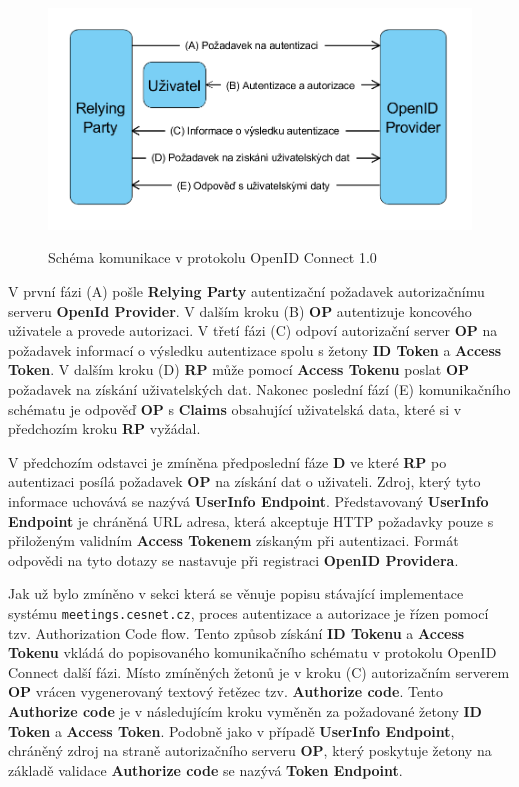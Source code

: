 \documentclass[
  printed, %
  twoside, %
  table,   %
  nolof,     %
  nolot,     %
]{fithesis3}
\begin{document}
\begin{figure}[H]
\caption{Schéma komunikace v protokolu OpenID Connect 1.0}
\centering
\includegraphics[width=12.8cm]{pics/diplomkaOIDC} 
\label{fig:oidc}
\end{figure}
\par 

V první fázi (A) pošle \textbf{Relying Party} autentizační požadavek autorizačnímu serveru \textbf{OpenId Provider}. V dalším kroku (B) \textbf{OP} autentizuje koncového uživatele a provede autorizaci. V třetí fázi (C) odpoví autorizační server \textbf{OP} na požadavek informací o výsledku autentizace spolu s žetony \textbf{ID Token} a \textbf{Access Token}. V dalším kroku (D) \textbf{RP} může pomocí \textbf{Access Tokenu} poslat \textbf{OP} požadavek na získání uživatelských dat. Nakonec poslední fází (E) komunikačního schématu je odpověď \textbf{OP} s \textbf{Claims} obsahující uživatelská data, které si v předchozím kroku \textbf{RP} vyžádal. \par

V předchozím odstavci je zmíněna předposlední fáze \textbf{D} ve které \textbf{RP} po autentizaci posílá požadavek \textbf{OP} na získání dat o uživateli. Zdroj, který tyto informace uchovává se nazývá \textbf{UserInfo Endpoint}. Představovaný \textbf{UserInfo Endpoint} je chráněná URL adresa, která akceptuje HTTP požadavky pouze s přiloženým validním \textbf{Access Tokenem} získaným při autentizaci. Formát odpovědi na tyto dotazy se nastavuje při registraci \textbf{OpenID Providera}.  \par

Jak už bylo zmíněno v sekci která se věnuje popisu stávající implementace systému \texttt{meetings.cesnet.cz}, proces autentizace a autorizace je řízen pomocí tzv. Authorization Code flow. Tento způsob získání \textbf{ID Tokenu} a \textbf{Access Tokenu} vkládá do popisovaného komunikačního schématu v protokolu OpenID Connect další fázi. Místo zmíněných žetonů je v kroku (C) autorizačním serverem \textbf{OP} vrácen vygenerovaný textový řetězec tzv. \textbf{Authorize code}. Tento \textbf{Authorize code} je v následujícím kroku vyměněn za požadované žetony \textbf{ID Token} a \textbf{Access Token}. Podobně jako v případě \textbf{UserInfo Endpoint}, chráněný zdroj na straně autorizačního serveru \textbf{OP}, který poskytuje žetony na základě validace \textbf{Authorize code} se nazývá \textbf{Token Endpoint}.
\end{document}
